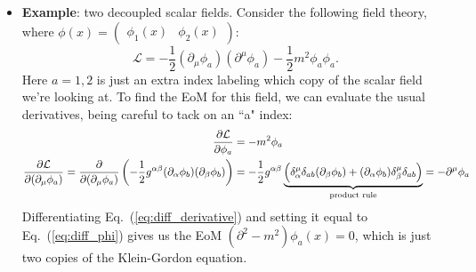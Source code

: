 \documentclass[12pt, oneside]{article}   	%
\theoremstyle{definition}
\begin{document}
\begin{itemize}
	\item \textbf{Example}: two decoupled scalar fields. Consider the following field theory, where $\phi(x) = \begin{pmatrix} \phi_1(x) & \phi_2(x) \end{pmatrix}$:
	\begin{equation}
		\mathcal L = -\frac{1}{2} (\partial_\mu\phi_a) (\partial^\mu \phi_a) - \frac{1}{2} m^2 \phi_a \phi_a.
	\end{equation}
	Here $a = 1, 2$ is just an extra index labeling which copy of the scalar field we're looking at. To find the EoM for this field, we can evaluate the usual derivatives, being careful to tack on an ``a" index:
	\begin{align}
		\frac{\partial\mathcal L}{\partial\phi_a} &= -m^2\phi_a \label{eq:diff_phi} \\
		\frac{\partial \mathcal{L}}{\partial (\partial_\mu\phi_a)} = \frac{\partial}{\partial (\partial_\mu\phi_a)} \left( -\frac{1}{2} g^{\alpha\beta} (\partial_\alpha \phi_b) (\partial_\beta\phi_b) \right) &= -\frac{1}{2} g^{\alpha\beta} \underbrace{\left(\delta^\mu_\alpha \delta_{ab} (\partial_\beta\phi_b ) + (\partial_\alpha\phi_b) \delta^\mu_\beta \delta_{ab} \right)}_{\textnormal{product rule}} = -\partial^\mu\phi_a \label{eq:diff_derivative}
	\end{align}
	Differentiating Eq.~(\ref{eq:diff_derivative}) and setting it equal to Eq.~(\ref{eq:diff_phi}) gives us the EoM $(\partial^2 - m^2)\phi_a(x) = 0$, which is just two copies of the Klein-Gordon equation.
	

\end{itemize}
\end{document}

